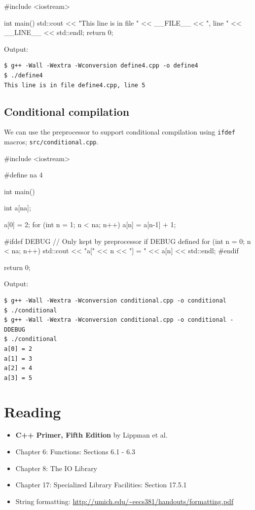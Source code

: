 \documentclass[12pt,letterpaper,twoside]{article}
\begin{document}
\begin{cpp}
#include <iostream>

int main() {
  std::cout << "This line is in file " << __FILE__
            << ", line " << __LINE__ << std::endl;
  return 0;
}
\end{cpp}

Output:

\begin{verbatim}
$ g++ -Wall -Wextra -Wconversion define4.cpp -o define4
$ ./define4
This line is in file define4.cpp, line 5
\end{verbatim}

\subsection{Conditional compilation}
We can use the preprocessor to support conditional compilation using \texttt{ifdef} macros;
\texttt{src/conditional.cpp}.

\begin{cpp}
#include <iostream>

#define na 4

int main() {
  int a[na];

  a[0] = 2;
  for (int n = 1; n < na; n++) a[n] = a[n-1] + 1;

#ifdef DEBUG
  // Only kept by preprocessor if DEBUG defined
  for (int n = 0; n < na; n++) {
    std::cout << "a[" << n << "] = " << a[n] << std::endl;
  }
#endif

  return 0;
}
\end{cpp}

Output:

\begin{verbatim}
$ g++ -Wall -Wextra -Wconversion conditional.cpp -o conditional
$ ./conditional
$ g++ -Wall -Wextra -Wconversion conditional.cpp -o conditional -DDEBUG
$ ./conditional
a[0] = 2
a[1] = 3
a[2] = 4
a[3] = 5
\end{verbatim}

\section{Reading}
\begin{itemize}
\item
  \textbf{C++ Primer, Fifth Edition} by Lippman et al.
\item
  Chapter 6: Functions: Sections 6.1 - 6.3
\item
  Chapter 8: The IO Library
\item
  Chapter 17: Specialized Library Facilities: Section 17.5.1
\item String formatting: \url{http://umich.edu/~eecs381/handouts/formatting.pdf}
\end{itemize}
\end{document}
